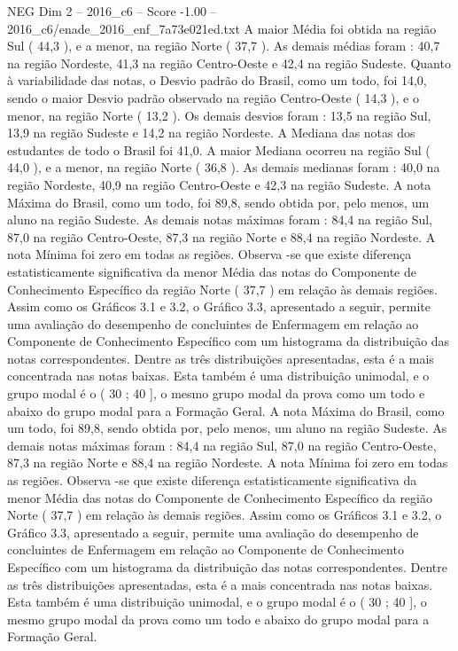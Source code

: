 \begin{textsample}{NEG Dim 2 – 2016\_c6 – Score -1.00 – 2016\_c6/enade\_2016\_enf\_7a73e021ed.txt}
A maior Média foi obtida na região Sul ( 44,3 ), e a menor, na região Norte ( 37,7 ).
As demais médias foram : 40,7 na região Nordeste, 41,3 na região Centro-Oeste e 42,4 na região Sudeste.
Quanto à variabilidade das notas, o Desvio padrão do Brasil, como um todo, foi 14,0, sendo o maior Desvio padrão observado na região Centro-Oeste ( 14,3 ), e o menor, na região Norte ( 13,2 ).
Os demais desvios foram : 13,5 na região Sul, 13,9 na região Sudeste e 14,2 na região Nordeste.
A Mediana das notas dos estudantes de todo o Brasil foi 41,0.
A maior Mediana ocorreu na região Sul ( 44,0 ), e a menor, na região Norte ( 36,8 ).
As demais medianas foram : 40,0 na região Nordeste, 40,9 na região Centro-Oeste e 42,3 na região Sudeste.
A nota Máxima do Brasil, como um todo, foi 89,8, sendo obtida por, pelo menos, um aluno na região Sudeste.
As demais notas máximas foram : 84,4 na região Sul, 87,0 na região Centro-Oeste, 87,3 na região Norte e 88,4 na região Nordeste.
A nota Mínima foi zero em todas as regiões.
Observa -se que existe diferença estatisticamente significativa da menor Média das notas do Componente de Conhecimento Específico da região Norte ( 37,7 ) em relação às demais regiões.
Assim como os Gráficos 3.1 e 3.2, o Gráfico 3.3, apresentado a seguir, permite uma avaliação do desempenho de concluintes de Enfermagem em relação ao Componente de Conhecimento Específico com um histograma da distribuição das notas correspondentes.
Dentre as três distribuições apresentadas, esta é a mais concentrada nas notas baixas.
Esta também é uma distribuição unimodal, e o grupo modal é o ( 30 ; 40 ], o mesmo grupo modal da prova como um todo e abaixo do grupo modal para a Formação Geral.
A nota Máxima do Brasil, como um todo, foi 89,8, sendo obtida por, pelo menos, um aluno na região Sudeste.
As demais notas máximas foram : 84,4 na região Sul, 87,0 na região Centro-Oeste, 87,3 na região Norte e 88,4 na região Nordeste.
A nota Mínima foi zero em todas as regiões.
Observa -se que existe diferença estatisticamente significativa da menor Média das notas do Componente de Conhecimento Específico da região Norte ( 37,7 ) em relação às demais regiões.
Assim como os Gráficos 3.1 e 3.2, o Gráfico 3.3, apresentado a seguir, permite uma avaliação do desempenho de concluintes de Enfermagem em relação ao Componente de Conhecimento Específico com um histograma da distribuição das notas correspondentes.
Dentre as três distribuições apresentadas, esta é a mais concentrada nas notas baixas.
Esta também é uma distribuição unimodal, e o grupo modal é o ( 30 ; 40 ], o mesmo grupo modal da prova como um todo e abaixo do grupo modal para a Formação Geral.

\end{textsample}

